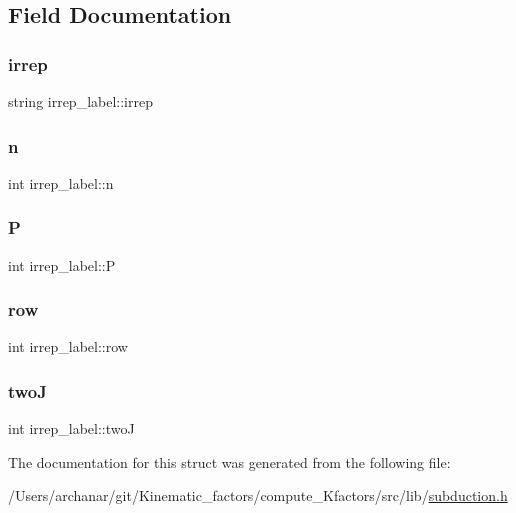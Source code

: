 \subsection{Field Documentation}
\mbox{\label{structirrep__label_a21e18e087b0a2a1d22886c0244d7e7e6}} 
\subsubsection{\texorpdfstring{irrep}{irrep}}
{\footnotesize\ttfamily string irrep\+\_\+label\+::irrep}

\mbox{\label{structirrep__label_a6f7203722a797aa0fb81e1e4a7370ad8}} 
\subsubsection{\texorpdfstring{n}{n}}
{\footnotesize\ttfamily int irrep\+\_\+label\+::n}

\mbox{\label{structirrep__label_a87f13a9fa6fc452cd31cfbc8cbc5197d}} 
\subsubsection{\texorpdfstring{P}{P}}
{\footnotesize\ttfamily int irrep\+\_\+label\+::P}

\mbox{\label{structirrep__label_a3e47b0519d5ae65e48b1e3fe509bcc13}} 
\subsubsection{\texorpdfstring{row}{row}}
{\footnotesize\ttfamily int irrep\+\_\+label\+::row}

\mbox{\label{structirrep__label_a2815db2b707875ae496bdbfd52d3c240}} 
\subsubsection{\texorpdfstring{twoJ}{twoJ}}
{\footnotesize\ttfamily int irrep\+\_\+label\+::twoJ}



The documentation for this struct was generated from the following file\+:\begin{DoxyCompactItemize}
\item 
/\+Users/archanar/git/\+Kinematic\+\_\+factors/compute\+\_\+\+Kfactors/src/lib/\mbox{\hyperlink{subduction_8h}{subduction.\+h}}\end{DoxyCompactItemize}
